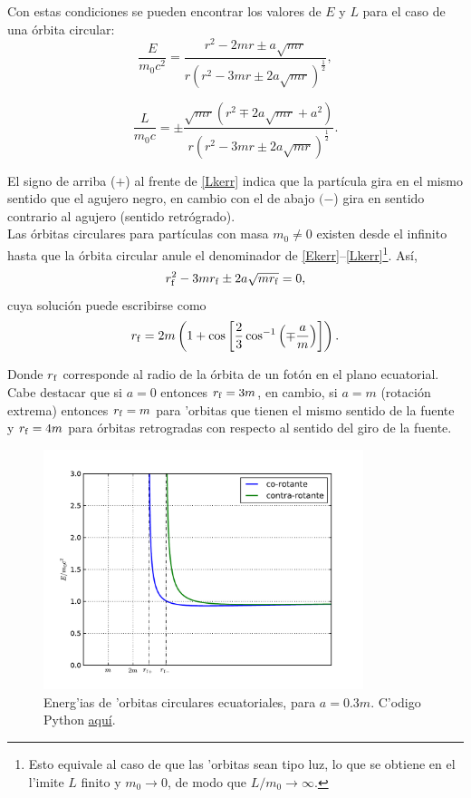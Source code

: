 Con estas condiciones se pueden encontrar los valores de $E$ y $L$ para el caso de una \'orbita circular:
\begin{equation}
\frac{E}{m_0c^2}=\frac{r^2-2mr\pm a\sqrt{mr}}{r\left(r^2-3mr\pm 2a\sqrt{mr}\right)^{\frac{1}{2}}} , \label{Ekerr}
\end{equation}

\begin{equation}
\frac{L}{m_0c}=\pm\frac{\sqrt{mr}\left(r^2\mp 2a\sqrt{mr}+a^2 \right)}{r\left(r^2-3mr\pm 2a\sqrt{mr}\right)^{\frac{1}{2}}} .\label{Lkerr} 
\end{equation}

El signo de arriba ($+$) al frente de \eqref{Lkerr} indica que la part\'icula gira en el mismo sentido que el agujero negro, en cambio con el de abajo $(-$) gira en sentido contrario al agujero (sentido retr\'ogrado).\\

Las \'orbitas circulares para part\'iculas con masa $m_0\neq 0$ existen desde el infinito hasta que la \'orbita circular anule el denominador de \eqref{Ekerr}--\eqref{Lkerr}\footnote{Esto equivale al caso de que las 'orbitas sean tipo luz, lo que se obtiene en el l'imite $L$ finito y $m_0\to 0$, de modo que $L/m_0\to\infty$.}. As\'i,
\begin{equation}
r^2_{\rm f}-3mr_{\rm f}\pm 2a\sqrt{mr_{\rm f}}=0,
\end{equation}
cuya soluci\'on puede escribirse como
\begin{equation}\label{phorbit}
r_{\rm f}=2m\left(1+\cos\left[\frac{2}{3}\cos^{-1}\left(\mp \frac{a}{m} \right) \right] \right).
\end{equation}

Donde $r_{\rm f}$ corresponde al radio de la \'orbita de un fot\'on en el plano ecuatorial. Cabe destacar que si $a=0$ entonces $r_{\rm f}=3m$, en cambio, si $a=m$ (rotaci\'on extrema) entonces $r_{\rm f}=m$ para 'orbitas que tienen el mismo sentido de la fuente y $r_{\rm f}=4m$ para \'orbitas retrogradas con respecto al sentido del giro de la fuente.\\

\begin{figure}[H]
\begin{center}
\includegraphics[height=7cm,angle=0]{fig/fig-Ecirc.pdf}
\caption{Energ'ias de 'orbitas circulares ecuatoriales, para $a=0.3m$. C'odigo Python \href{https://github.com/gfrubi/GR/blob/master/figuras-editables/fig-Ecirc.py}{aqu\'i}.}
\label{fig:Ecirc}
\end{center}
\end{figure}

